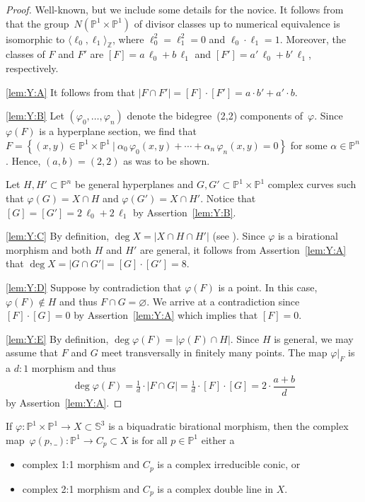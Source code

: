 \documentclass[11pt]{article}
\newenvironment{Mlist}{\begin{itemize}[topsep=0pt,itemsep=4pt,leftmargin=7mm]}{\end{itemize}}
\renewcommand{\P}{\mathbb{P}}
\renewcommand{\S}{\mathbb{S}}
\newcommand{\Z}{\mathbb{Z}}
\renewcommand{\c}{\colon}
\newcommand{\set}[2]{\left\{#1 ~|~ #2\right\}}
\newcommand{\resp}{respectively}
\newcommand{\st}{such that }
\renewcommand{\l}{\ell}
\newcommand{\bas}[1]{\langle #1\rangle}
\begin{document}
\begin{proof}
Well-known, but we include some details for the novice.
It follows from \citep[Exercise~I.2.15a and Example~V.1.9.2]{1977}
that the group~$N(\P^1\times\P^1)$ of divisor classes up to numerical equivalence
is isomorphic to
$\bas{\l_0,\l_1}_\Z$, where $\l_0^2=\l_1^2=0$ and $\l_0\cdot\l_1=1$.
Moreover, the classes of $F$ and $F'$ are
$[F]=a\,\l_0+b\,\l_1$ and $[F']=a'\,\l_0+b'\,\l_1$, \resp.

\ref{lem:Y:A}
It follows from \citep[Theorem~V.1.1]{1977} that
$|F\cap F'|=[F]\cdot [F']=a\cdot b'+a'\cdot b$.

\ref{lem:Y:B}
Let $(\varphi_0,\ldots,\varphi_n)$ denote the bidegree~(2,2) components of~$\varphi$.
Since $\varphi(F)$ is a hyperplane section,
we find that
$F=\set{(x,y)\in\P^1\times\P^1}{\alpha_0\,\varphi_0(x,y)+\cdots+\alpha_n\,\varphi_n(x,y)=0}$
for some $\alpha\in\P^n$. Hence, $(a,b)=(2,2)$ as was to be shown.

Let $H,H'\subset\P^n$ be general hyperplanes
and $G,G'\subset\P^1\times\P^1$ complex curves \st
$\varphi(G)=X\cap H$ and $\varphi(G')=X\cap H'$.
Notice that $[G]=[G']=2\,\l_0+2\,\l_1$ by Assertion~\ref{lem:Y:B}.

\ref{lem:Y:C}
By definition, $\deg X=|X\cap H\cap H'|$ (see \citep[\textsection I.7]{1977}).
Since $\varphi$ is a birational morphism and both $H$ and $H'$ are general,
it follows from Assertion~\ref{lem:Y:A} that $\deg X=|G\cap G'|=[G]\cdot [G']=8$.

\ref{lem:Y:D}
Suppose by contradiction that $\varphi(F)$ is a point.
In this case, $\varphi(F)\notin H$
and thus $F\cap G=\varnothing$.
We arrive at a contradiction
since $[F]\cdot [G]=0$ by Assertion~\ref{lem:Y:A} which implies that $[F]=0$.


\ref{lem:Y:E}
By definition, $\deg \varphi(F)=|\varphi(F)\cap H|$.
Since $H$ is general, we may assume that $F$ and $G$ meet transversally in finitely many points.
The map $\varphi|_F$ is a $d:1$ morphism and thus
\[
\deg \varphi(F)=\tfrac{1}{d}\cdot|F\cap G|=\tfrac{1}{d}\cdot[F]\cdot[G]=2\cdot\frac{a+b}{d}
\]
by Assertion~\ref{lem:Y:A}.
\end{proof}

\begin{lemma}
\label{lem:nopoint}
If $\varphi\c\P^1\times\P^1\to X\subset\S^3$ is a biquadratic birational morphism,
then the complex map~$\varphi(p,\_)\c\P^1\to C_p\subset X$ is for all $p\in \P^1$ either a
\begin{Mlist}
\item complex 1:1 morphism and $C_p$ is a complex irreducible conic, or
\item complex 2:1 morphism and $C_p$ is a complex double line in $X$.
\end{Mlist}
\end{lemma}
\end{document}
